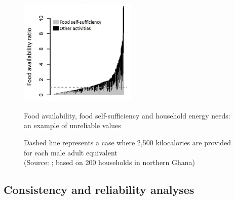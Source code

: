 \begin{figure}
  \includegraphics[width=0.5\textwidth]{figs_03/image1.png}
  \captionsetup{singlelinecheck = off, justification=justified} %
  \caption{Food availability, food self-sufficiency and household energy needs: an example of unreliable values}
  \small
  \vspace*{-3mm}
  \caption*{Dashed line represents a case where 2,500 kilocalories are provided for each male adult equivalent \\
    (Source: \citealp{Rosenstock2017}; based on 200 households in northern Ghana)}
  \label{fig:03_1}
\end{figure}


\subsection{Consistency and reliability analyses}

